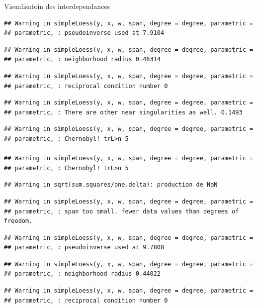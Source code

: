 \documentclass[11pt,ignorenonframetext,]{beamer}
\begin{document}
\begin{frame}[fragile]{Visualisatoin des interdependances}
\begin{verbatim}
## Warning in simpleLoess(y, x, w, span, degree = degree, parametric =
## parametric, : pseudoinverse used at 7.9104
\end{verbatim}

\begin{verbatim}
## Warning in simpleLoess(y, x, w, span, degree = degree, parametric =
## parametric, : neighborhood radius 0.46314
\end{verbatim}

\begin{verbatim}
## Warning in simpleLoess(y, x, w, span, degree = degree, parametric =
## parametric, : reciprocal condition number 0
\end{verbatim}

\begin{verbatim}
## Warning in simpleLoess(y, x, w, span, degree = degree, parametric =
## parametric, : There are other near singularities as well. 0.1493
\end{verbatim}

\begin{verbatim}
## Warning in simpleLoess(y, x, w, span, degree = degree, parametric =
## parametric, : Chernobyl! trL>n 5

## Warning in simpleLoess(y, x, w, span, degree = degree, parametric =
## parametric, : Chernobyl! trL>n 5
\end{verbatim}

\begin{verbatim}
## Warning in sqrt(sum.squares/one.delta): production de NaN
\end{verbatim}

\begin{verbatim}
## Warning in simpleLoess(y, x, w, span, degree = degree, parametric =
## parametric, : span too small. fewer data values than degrees of freedom.
\end{verbatim}

\begin{verbatim}
## Warning in simpleLoess(y, x, w, span, degree = degree, parametric =
## parametric, : pseudoinverse used at 9.7808
\end{verbatim}

\begin{verbatim}
## Warning in simpleLoess(y, x, w, span, degree = degree, parametric =
## parametric, : neighborhood radius 0.44022
\end{verbatim}

\begin{verbatim}
## Warning in simpleLoess(y, x, w, span, degree = degree, parametric =
## parametric, : reciprocal condition number 0
\end{verbatim}


\end{frame}
\end{document}
